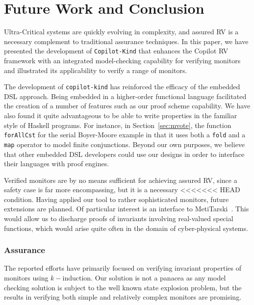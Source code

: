 \section{Future Work and Conclusion}\label{sec:conclusion}

 Ultra-Critical systems are quickly evolving in complexity, and assured
 RV is a necessary complement to traditional assurance techniques.  
In this paper, we have presented the development of
\texttt{Copilot-Kind} that enhances the Copilot RV framework with an
integrated model-checking capability for verifying monitors and
illustrated its applicability to verify a range of monitors.


The development of \texttt{copilot-kind} has reinforced the efficacy
of the embedded DSL approach. Being embedded in a higher-order
functional language facilitated the creation of a number of features
such as our proof scheme capability. We have also found it quite
advantageous to be able to write properties in the familiar style of
Haskell programs. For instance, in Section~\ref{sec:mvote}, the
function \texttt{forAllCst} for the serial Boyer-Moore example in that
it uses both a \texttt{fold} and a \texttt{map} operator to model
finite conjunctions.  Beyond our own purposes, we believe that other
embedded DSL developers could use our designs in order to interface
their languages with proof engines.

Verified  monitors are by no means sufficient for achieving assured RV,
since a safety case is far more encompassing, but it is a necessary
<<<<<<< HEAD
condition.  Having applied our tool to rather
sophisticated monitors,  future extensions are planned.  Of particular
interest is an interface to 
MetiTarski~\cite{AkbarpourPaulson}. This would allow us to discharge
proofs of invariants involving real-valued special functions, which
would arise quite often in the domain of cyber-physical systems.

\subsubsection{Assurance} The reported efforts have
primarily focused on verifying invariant properties of monitors using
$k-$induction. Our solution is not a panacea as any model checking
solution is subject to the well known state explosion problem, but 
the results in verifying both simple and relatively complex monitors
are promising. 

